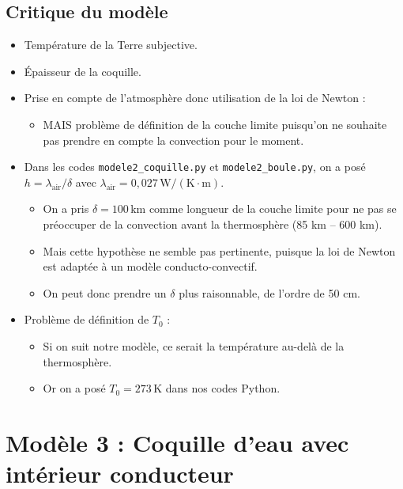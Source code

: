 \documentclass[a4paper,12pt]{article}
\begin{document}
\subsection{Critique du modèle}

\begin{itemize}
    \item Température de la Terre subjective.
    \item Épaisseur de la coquille.
    \item Prise en compte de l’atmosphère donc utilisation de la loi de Newton :
    \begin{itemize}
        \item MAIS problème de définition de la couche limite puisqu’on ne souhaite pas prendre en compte la convection pour le moment.
    \end{itemize}
    \item Dans les codes \texttt{modele2\_coquille.py} et \texttt{modele2\_boule.py}, on a posé $h = \lambda_{\text{air}} / \delta$ avec $\lambda_{\text{air}} = 0{,}027 \, \mathrm{W/(K \cdot m)}$.
    \begin{itemize}
        \item On a pris $\delta = 100\, \mathrm{km}$ comme longueur de la couche limite pour ne pas se préoccuper de la convection avant la thermosphère (85 km – 600 km).
        \item Mais cette hypothèse ne semble pas pertinente, puisque la loi de Newton est adaptée à un modèle conducto-convectif.
        \item On peut donc prendre un $\delta$ plus raisonnable, de l’ordre de 50 cm.
    \end{itemize}
    \item Problème de définition de $T_0$ :
    \begin{itemize}
        \item Si on suit notre modèle, ce serait la température au-delà de la thermosphère.
        \item Or on a posé $T_0 = 273\, \mathrm{K}$ dans nos codes Python.
    \end{itemize}
\end{itemize}

\newpage
\section{Modèle 3 : Coquille d’eau avec intérieur conducteur }
\end{document}
